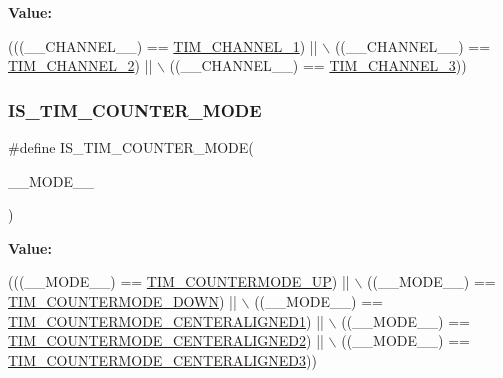 {\bfseries Value\+:}
\begin{DoxyCode}
(((\_\_CHANNEL\_\_) == \hyperlink{group___t_i_m___channel_ga6b1541e4a49d62610899e24bf23f4879}{TIM\_CHANNEL\_1}) || \(\backslash\)
                                                    ((\_\_CHANNEL\_\_) == 
      \hyperlink{group___t_i_m___channel_ga33e02d43345a7ac5886f01b39e4f7ccd}{TIM\_CHANNEL\_2}) || \(\backslash\)
                                                    ((\_\_CHANNEL\_\_) == 
      \hyperlink{group___t_i_m___channel_ga4ea100c1789b178f3cb46721b7257e2d}{TIM\_CHANNEL\_3}))
\end{DoxyCode}
\mbox{\label{group___t_i_m___private___macros_ga51e09bf84a3abf86e47fa45047fd6506}} 
\subsubsection{\texorpdfstring{I\+S\+\_\+\+T\+I\+M\+\_\+\+C\+O\+U\+N\+T\+E\+R\+\_\+\+M\+O\+DE}{IS\_TIM\_COUNTER\_MODE}}
{\footnotesize\ttfamily \#define I\+S\+\_\+\+T\+I\+M\+\_\+\+C\+O\+U\+N\+T\+E\+R\+\_\+\+M\+O\+DE(\begin{DoxyParamCaption}\item[{}]{\+\_\+\+\_\+\+M\+O\+D\+E\+\_\+\+\_\+ }\end{DoxyParamCaption})}

{\bfseries Value\+:}
\begin{DoxyCode}
(((\_\_MODE\_\_) == \hyperlink{group___t_i_m___counter___mode_ga9eb9ab91119c2c76d4db453d599c0b7d}{TIM\_COUNTERMODE\_UP})              || \(\backslash\)
                                            ((\_\_MODE\_\_) == \hyperlink{group___t_i_m___counter___mode_ga5f590fdd7c41df7180b870bb76ff691c}{TIM\_COUNTERMODE\_DOWN})       
           || \(\backslash\)
                                            ((\_\_MODE\_\_) == 
      \hyperlink{group___t_i_m___counter___mode_ga26d8e5236c35d85c2abaa482b5ec6746}{TIM\_COUNTERMODE\_CENTERALIGNED1})  || \(\backslash\)
                                            ((\_\_MODE\_\_) == 
      \hyperlink{group___t_i_m___counter___mode_gae4517c68086ffa61a694576cec8fe634}{TIM\_COUNTERMODE\_CENTERALIGNED2})  || \(\backslash\)
                                            ((\_\_MODE\_\_) == 
      \hyperlink{group___t_i_m___counter___mode_gaf0c3edf6ea1ade3520ab4970e1fc6e92}{TIM\_COUNTERMODE\_CENTERALIGNED3}))
\end{DoxyCode}
\mbox{\label{group___t_i_m___private___macros_gaf79d218bcde86838a6371534dad4acdd}} 
